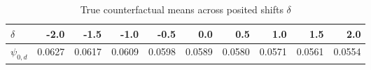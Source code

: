 \begin{table}[H]
\centering
\def\~{\hphantom{0}}
\begin{minipage}{175mm}
\caption{\label{tab:table:hvtn_moderate_truths}True counterfactual means across
   posited shifts $\delta$}
\begin{tabular}[t]{l|r|r|r|r|r|r|r|r|r}
\hline
$\delta$ & -2.0 & -1.5 & -1.0 & -0.5 & 0.0 & 0.5 & 1.0 & 1.5 & 2.0\\
\hline
$\psi_{0,d}$ & 0.0627 & 0.0617 & 0.0609 & 0.0598 & 0.0589 & 0.0580 & 0.0571 & 0.0561 & 0.0554\\
\hline
\end{tabular}
\end{minipage}
\vspace*{-6pt}
\end{table}
